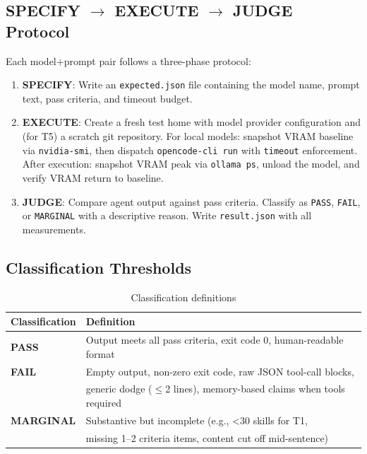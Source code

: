 \documentclass[11pt,a4paper]{article}
\begin{document}
\subsection{SPECIFY $\rightarrow$ EXECUTE $\rightarrow$ JUDGE Protocol}

Each model+prompt pair follows a three-phase protocol:

\begin{enumerate}[label=\textbf{\arabic*.}]
    \item \textbf{SPECIFY}: Write an \texttt{expected.json} file containing the model name, prompt text, pass criteria, and timeout budget.
    \item \textbf{EXECUTE}: Create a fresh test home with model provider configuration and (for T5) a scratch git repository. For local models: snapshot VRAM baseline via \texttt{nvidia-smi}, then dispatch \texttt{opencode-cli run} with \texttt{timeout} enforcement. After execution: snapshot VRAM peak via \texttt{ollama ps}, unload the model, and verify VRAM return to baseline.
    \item \textbf{JUDGE}: Compare agent output against pass criteria. Classify as \texttt{PASS}, \texttt{FAIL}, or \texttt{MARGINAL} with a descriptive reason. Write \texttt{result.json} with all measurements.
\end{enumerate}

\subsection{Classification Thresholds}

\begin{table}[H]
\centering
\begin{tabular}{ll}
\toprule
Classification & Definition \\
\midrule
\textbf{PASS}    & Output meets all pass criteria, exit code 0, human-readable format \\
\textbf{FAIL}    & Empty output, non-zero exit code, raw JSON tool-call blocks, \\
                 & generic dodge ($\leq$2 lines), memory-based claims when tools required \\
\textbf{MARGINAL} & Substantive but incomplete (e.g., <30 skills for T1, \\
                 & missing 1--2 criteria items, content cut off mid-sentence) \\
\bottomrule
\end{tabular}
\caption{Classification definitions}
\end{table}
\end{document}
